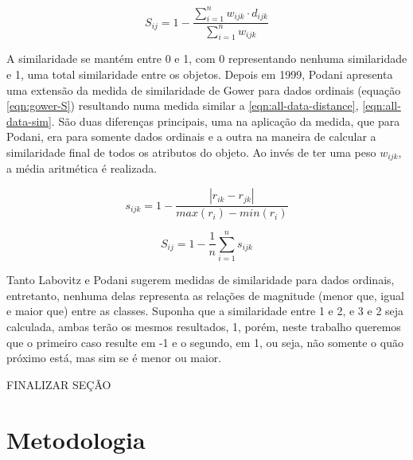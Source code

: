 \documentclass[preprint,12pt]{elsarticle}
\begin{document}
\begin{equation}
\label{eqn:all-data-sim}
    S_{ij} = 1 - \frac{\sum^n_{i=1} w_{ijk} \cdot d_{ijk}}{\sum^n_{i=1} w_{ijk}}
\end{equation}

A similaridade se mantém entre 0 e 1, com 0 representando nenhuma similaridade e 1, uma total similaridade entre os objetos. Depois em 1999, Podani \cite{extending-gower-ordinal} apresenta uma extensão da medida de similaridade de Gower para dados ordinais (equação \ref{eqn:gower-S}) resultando numa medida similar a \ref{eqn:all-data-distance}, \ref{eqn:all-data-sim}. São duas diferenças principais, uma na aplicação da medida, que para Podani, era para somente dados ordinais e a outra na maneira de calcular a similaridade final de todos os atributos do objeto. Ao invés de ter uma peso $w_{ijk}$, a média aritmética é realizada.

\begin{equation}
\label{eqn:gower-s}
    s_{ijk} =  1 - \frac{|r_{ik} - r_{jk}|}{max(r_i) - min(r_i)}
\end{equation}

\begin{equation}
\label{eqn:gower-S}
    S_{ij} =  1 - \frac{1}{n}\sum^n_{i=1}s_{ijk}
\end{equation}

Tanto Labovitz e Podani sugerem medidas de similaridade para dados ordinais, entretanto, nenhuma delas representa as relações de magnitude (menor que, igual e maior que) entre as classes. Suponha que a similaridade entre 1 e 2, e 3 e 2 seja calculada, ambas terão os mesmos resultados, 1, porém, neste trabalho queremos que o primeiro caso resulte em -1 e o segundo, em 1, ou seja, não somente o quão próximo está, mas sim se é menor ou maior.

FINALIZAR SEÇÃO

\section{Metodologia}
\label{sec:sample3}
\end{document}
